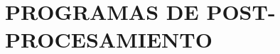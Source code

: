 \documentclass[letterpaper,titlepage,12pt,oneside,spanish,final]{report_eie}
\begin{document}
\chapter{PROGRAMAS DE POST-PROCESAMIENTO}\label{CAP:anexo3}
%


\newpage

%
\renewcommand{\bibname}{REFERENCIAS}
\let\oldbibsection\bibsection




\printindex%
\end{document}

